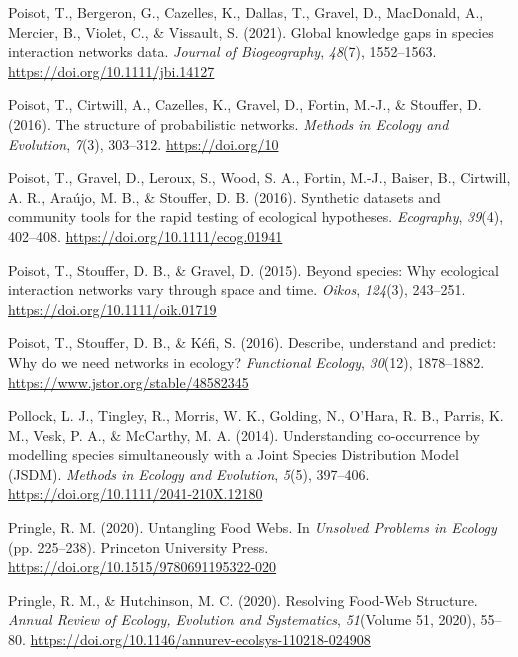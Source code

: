 \documentclass[
]{article}
\newlength{\cslhangindent}
\newenvironment{CSLReferences}[2] %
 {\begin{list}{}{%
  \setlength{\itemindent}{0pt}
  \setlength{\leftmargin}{0pt}
  \setlength{\parsep}{0pt}
  \ifodd #1
   \setlength{\leftmargin}{\cslhangindent}
   \setlength{\itemindent}{-1\cslhangindent}
  \fi
  \setlength{\itemsep}{#2\baselineskip}}}
 {\end{list}}
\begin{document}
\begin{CSLReferences}{1}{0}
Poisot, T., Bergeron, G., Cazelles, K., Dallas, T., Gravel, D.,
MacDonald, A., Mercier, B., Violet, C., \& Vissault, S. (2021). Global
knowledge gaps in species interaction networks data. \emph{Journal of
Biogeography}, \emph{48}(7), 1552--1563.
\url{https://doi.org/10.1111/jbi.14127}

Poisot, T., Cirtwill, A., Cazelles, K., Gravel, D., Fortin, M.-J., \&
Stouffer, D. (2016). The structure of probabilistic networks.
\emph{Methods in Ecology and Evolution}, \emph{7}(3), 303--312.
\url{https://doi.org/10}

Poisot, T., Gravel, D., Leroux, S., Wood, S. A., Fortin, M.-J., Baiser,
B., Cirtwill, A. R., Araújo, M. B., \& Stouffer, D. B. (2016). Synthetic
datasets and community tools for the rapid testing of ecological
hypotheses. \emph{Ecography}, \emph{39}(4), 402--408.
\url{https://doi.org/10.1111/ecog.01941}

Poisot, T., Stouffer, D. B., \& Gravel, D. (2015). Beyond species: Why
ecological interaction networks vary through space and time.
\emph{Oikos}, \emph{124}(3), 243--251.
\url{https://doi.org/10.1111/oik.01719}

Poisot, T., Stouffer, D. B., \& Kéfi, S. (2016). Describe, understand
and predict: Why do we need networks in ecology? \emph{Functional
Ecology}, \emph{30}(12), 1878--1882.
\url{https://www.jstor.org/stable/48582345}

Pollock, L. J., Tingley, R., Morris, W. K., Golding, N., O'Hara, R. B.,
Parris, K. M., Vesk, P. A., \& McCarthy, M. A. (2014). Understanding
co-occurrence by modelling species simultaneously with a {Joint Species
Distribution Model} ({JSDM}). \emph{Methods in Ecology and Evolution},
\emph{5}(5), 397--406. \url{https://doi.org/10.1111/2041-210X.12180}

Pringle, R. M. (2020). Untangling {Food Webs}. In \emph{Unsolved
{Problems} in {Ecology}} (pp. 225--238). Princeton University Press.
\url{https://doi.org/10.1515/9780691195322-020}

Pringle, R. M., \& Hutchinson, M. C. (2020). Resolving {Food-Web
Structure}. \emph{Annual Review of Ecology, Evolution and Systematics},
\emph{51}(Volume 51, 2020), 55--80.
\url{https://doi.org/10.1146/annurev-ecolsys-110218-024908}


\end{CSLReferences}
\end{document}
